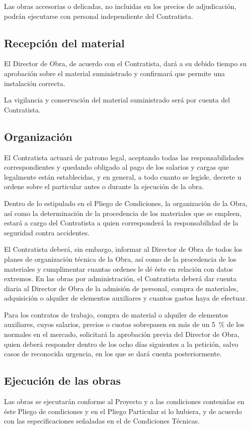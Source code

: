 Las obras accesorias o delicadas,  no incluidas en los precios de adjudicación,  podrán ejecutarse con personal independiente del Contratista.
\subsection{Recepción del material}
\label{subsec:pliego-recepcionOrg}
El Director de Obra, de acuerdo con el Contratista, dará a su debido tiempo su aprobación sobre el material suministrado y confirmará que permite una instalación correcta.

La vigilancia y conservación del material suministrado será por cuenta del Contratista. 
\subsection{Organización}
\label{subsec:pliego-organizacionnOrg}
El Contratista actuará de patrono legal, aceptando todas las responsabilidades correspondientes y quedando obligado al pago de los salarios y cargas que legalmente están establecidas, y en general, a todo cuanto se legisle, decrete  u ordene sobre el particular antes o durante la ejecución de la obra.

Dentro de lo estipulado en el Pliego de Condiciones, la organización de la Obra, así como la determinación de la procedencia de los materiales que se empleen, estará a cargo del Contratista a quien corresponderá la responsabilidad de la seguridad contra accidentes.  

El Contratista deberá, sin embargo, informar al Director de Obra de todos los planes de organización técnica de la Obra, así como de la procedencia de los materiales y cumplimentar  cuantas ordenes le dé éste en relación con datos extremos.  
En las obras por administración, el Contratista deberá dar cuenta diaria al Director de Obra de la admisión de personal, compra de materiales, adquisición o alquiler de elementos auxiliares y cuantos gastos haya de efectuar. 

Para los contratos de trabajo, compra de material o alquiler de elementos auxiliares, cuyos salarios, precios o cuotas sobrepasen en más de un \SI{5}{\percent} de los normales en el mercado, solicitará la aprobación previa del Director de Obra, quien deberá responder dentro de los ocho días siguientes a la petición, salvo casos de reconocida urgencia, en los que se dará cuenta posteriormente. 

\subsection{Ejecución de las obras}
\label{subsec:pliego-ejecucionOrg}
Las obras se ejecutarán conforme al Proyecto y a las condiciones contenidas en éste Pliego de condiciones y en el Pliego Particular si lo hubiera, y de acuerdo con las especificaciones señaladas en el de Condiciones Técnicas.  

